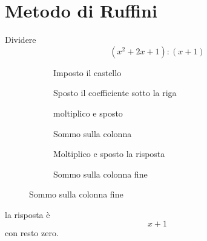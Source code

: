 \section{Metodo di Ruffini}
\begin{esempiot}{}{}
Dividere
\[(x^2+2x+1):(x+1)\]
\end{esempiot}
\begin{figure}
	\begin{subfigure}[b]{0.55\linewidth}
		\centering
		\caption{Imposto il castello}\label{fig:Ruffiniesempio1a}
	\end{subfigure}%
	\captionsetup{skip=0pt}
	\begin{subfigure}[b]{0.55\linewidth}
		\centering\centering
		\caption{Sposto il coefficiente sotto la riga}\label{fig:Ruffiniesempio1b}
	\end{subfigure}
	\begin{subfigure}[b]{.55\linewidth}
		\centering\centering
		\caption{moltiplico e sposto}\label{fig:Ruffiniesempio1c}
	\end{subfigure}%
		\captionsetup{skip=0pt}
	\begin{subfigure}[b]{.55\linewidth}
		\centering\centering
		\caption{Sommo sulla colonna}\label{fig:Ruffiniesempio1d}
	\end{subfigure}
	\begin{subfigure}[b]{.55\linewidth}
			\centering\centering
			\caption{Moltiplico e sposto la risposta}\label{fig:Ruffiniesempio1e}
		\end{subfigure}%
		\captionsetup{skip=0pt}
		\begin{subfigure}[b]{.55\linewidth}
			\centering\centering
			\caption{Sommo sulla colonna fine}\label{fig:Ruffiniesempio1f}
		\end{subfigure}
\label{fig:Ruffiniesempio1}
\end{figure}


la risposta è \[x+1\] con resto zero.

